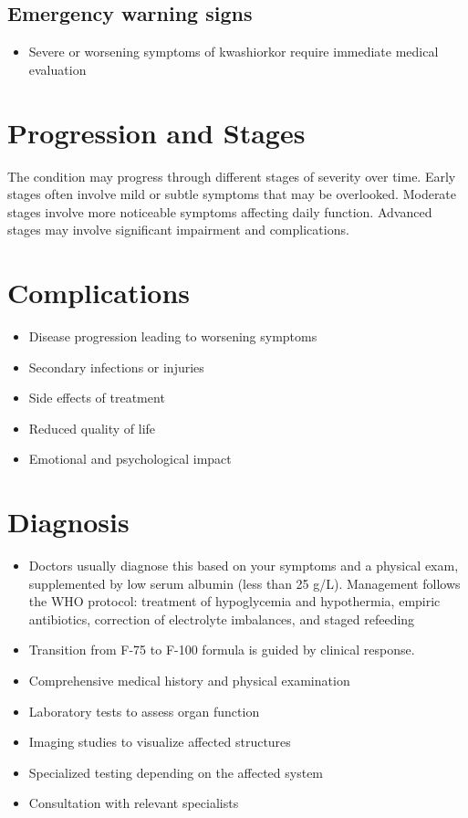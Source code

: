 \subsection{Emergency warning signs}
\begin{itemize}[noitemsep]
  \item Severe or worsening symptoms of kwashiorkor require immediate medical evaluation
\end{itemize}
\section{Progression and Stages}
The condition may progress through different stages of severity over time. Early stages often involve mild or subtle symptoms that may be overlooked. Moderate stages involve more noticeable symptoms affecting daily function. Advanced stages may involve significant impairment and complications.
\section{Complications}
\begin{itemize}[noitemsep]
  \item Disease progression leading to worsening symptoms
  \item Secondary infections or injuries
  \item Side effects of treatment
  \item Reduced quality of life
  \item Emotional and psychological impact
\end{itemize}
\section{Diagnosis}
\begin{itemize}[noitemsep]
  \item Doctors usually diagnose this based on your symptoms and a physical exam, supplemented by low serum albumin (less than 25 g/L). Management follows the WHO protocol: treatment of hypoglycemia and hypothermia, empiric antibiotics, correction of electrolyte imbalances, and staged refeeding
  \item Transition from F-75 to F-100 formula is guided by clinical response.
  \item Comprehensive medical history and physical examination
  \item Laboratory tests to assess organ function
  \item Imaging studies to visualize affected structures
  \item Specialized testing depending on the affected system
  \item Consultation with relevant specialists
\end{itemize}
